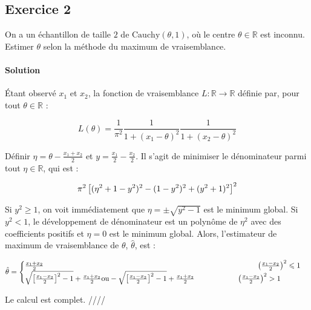 \documentclass[../main.tex]{subfiles}
\begin{document}
\begin{CJK*}{UTF8}{gbsn}

\section*{Exercice 2}

On a un échantillon de taille $2$ de $\text{Cauchy}(\theta, 1)$, où le centre $\theta \in \mathbb{R}$ est inconnu.
Estimer $\theta$ selon la méthode du maximum de vraisemblance. 

\paragraph{Solution}
Étant observé $x_1$ et $x_2$,
la fonction de vraisemblance $L : \mathbb{R} \to \mathbb{R}$ définie par, pour tout $\theta \in \mathbb{R}$ :

\begin{equation*}
L(\theta) = \frac{1}{\pi^2} \frac{1}{1 + (x_1 - \theta)^2} \frac{1}{1 + (x_2 - \theta)^2} 
\end{equation*}

Définir $\eta = \theta - \frac{x_1 + x_2}{2}$ et $y = \frac{x_1}{2} - \frac{x_2}{2} $.
Il s'agit de minimiser le dénominateur parmi tout $\eta \in \mathbb{R}$, qui est :

\begin{equation*}
    \pi^2 \squared{(\eta^2 + 1 - y^2)^2 - (1-y^2)^2 + (y^2+1)^2}^2
\end{equation*}

Si $y^2 \geqslant 1$, on voit immédiatement que $\eta = \pm \sqrt{y^2 - 1}$ est le minimum global.
Si $y^2 < 1$, le développement de dénominateur est un polynôme de $\eta^2$ avec des coefficients positifs
et $\eta = 0$ est le minimum global. Alors, 
l'estimateur de maximum de vraisemblance de $\theta$, $\hat{\theta}$, est :

\begin{equation*}
    \hat{\theta} = 
    \begin{cases}
        \frac{x_1 + x_2}{2} \tab[10.1cm] \bracket{\frac{x_1-x_2}{2}}^2 \leqslant 1 \\
        \sqrt{\squared{\frac{x_1-x_2}{2}}^2 - 1} + \frac{x_1 + x_2}{2} 
        \text{ou} -\sqrt{\squared{\frac{x_1-x_2}{2}}^2 - 1} + \frac{x_1 + x_2}{2} \tab[2cm] \bracket{\frac{x_1-x_2}{2}}^2 > 1
    \end{cases}
\end{equation*}

Le calcul est complet. ////

\end{CJK*}
\end{document}
